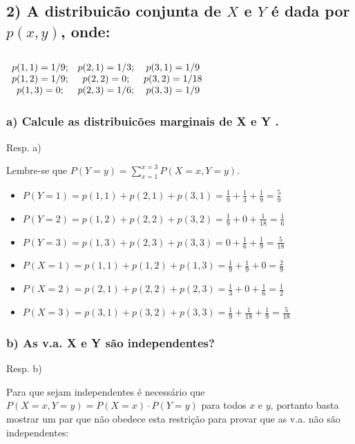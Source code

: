 \documentclass[portuguese]{article}
\begin{document}
\textbf{\textcompwordmark{}}


\subsection*{\textmd{2) A distribuicão conjunta de $X$ e $Y$ é dada por $p(x,y)$,
onde:}}


\subsection*{\textmd{$\protect\begin{array}{ccc}
p(1,1)=1/9; & p(2,1)=1/3; & p(3,1)=1/9\protect\\
p(1,2)=1/9; & p(2,2)=0; & p(3,2)=1/18\protect\\
p(1,3)=0; & p(2,3)=1/6; & p(3,3)=1/9
\protect\end{array}$ }}


\subsubsection*{\textmd{a) Calcule as distribuicões marginais de X e Y . }}

Resp. a)

Lembre-se que $P(Y=y)=\sum_{x=1}^{x=3}P(X=x,Y=y)$.
\begin{itemize}
\item $P(Y=1)=p(1,1)+p(2,1)+p(3,1)=\frac{1}{9}+\frac{1}{3}+\frac{1}{9}=\frac{5}{9}$
\item $P(Y=2)=p(1,2)+p(2,2)+p(3,2)=\frac{1}{9}+0+\frac{1}{18}=\frac{1}{6}$
\item $P(Y=3)=p(1,3)+p(2,3)+p(3,3)=0+\frac{1}{6}+\frac{1}{9}=\frac{5}{18}$
\item $P(X=1)=p(1,1)+p(1,2)+p(1,3)=\frac{1}{9}+\frac{1}{9}+0=\frac{2}{9}$
\item $P(X=2)=p(2,1)+p(2,2)+p(2,3)=\frac{1}{3}+0+\frac{1}{6}=\frac{1}{2}$
\item $P(X=3)=p(3,1)+p(3,2)+p(3,3)=\frac{1}{9}+\frac{1}{18}+\frac{1}{9}=\frac{5}{18}$
\end{itemize}

\subsubsection*{\textmd{b) As v.a. X e Y são independentes? }}

Resp. b) 

Para que sejam independentes é necessário que $P(X=x,Y=y)=P(X=x)\cdot P(Y=y)$
para todos $x$ e $y$, portanto basta mostrar um par que não obedece
esta restrição para provar que as v.a. não são independentes:
\end{document}
